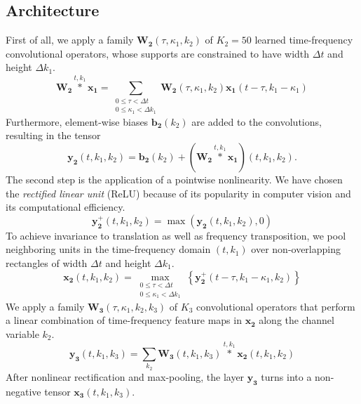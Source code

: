 \documentclass{article}
\begin{document}
\subsection{Architecture}
First of all, we apply a family $\boldsymbol{W_2}(\tau,\kappa_1,k_2)$ of $K_2=50$ learned time-frequency convolutional operators, whose supports are constrained to have width $\Delta t$ and height $\Delta k_1$. 
\begin{equation}
\boldsymbol{W_2}
\overset{t,k_1}{\ast}
\boldsymbol{x_1}
=
\! \!
\sum_{\substack{
0 \leq \tau < \Delta t \\
0 \leq \kappa_1 < \Delta k_1}}
\! \! \! \! \!
\boldsymbol{W_2}(\tau,\kappa_1,k_2)
\boldsymbol{x_1}(t-\tau,k_1-\kappa_1)
\end{equation}
Furthermore, element-wise biases $\boldsymbol{b_2}(k_2)$ are added to the convolutions, resulting in the tensor 
\begin{equation}
\boldsymbol{y_2}(t,k_1,k_2) =
\boldsymbol{b_2}(k_2) + 
(\boldsymbol{W_2}
\overset{t,k_1}{\ast}
\boldsymbol{x_1})(t,k_1,k_2).
\end{equation}
The second step is the application of a pointwise nonlinearity. We have chosen the \emph{rectified linear unit} (ReLU) because of its popularity in computer vision and its computational efficiency.
 \begin{equation}
 \boldsymbol{y_{2}^{+}}(t,k_1,k_2) = \max \left( \boldsymbol{y_2}(t,k_1,k_2), 0\right)
 \end{equation}
 To achieve invariance to translation as well as frequency transposition, we pool neighboring units in
 the time-frequency domain $(t,k_1)$ over non-overlapping rectangles of width $\Delta t$ and height $\Delta k_1$.
 \begin{equation}
 \boldsymbol{x_2}(t,k_1,k_2) = \! \!
 \max_{
\substack{
0 \leq \tau < \Delta t \\
0 \leq \kappa_1 < \Delta k_1}
 } \! \!
\left\{
 \boldsymbol{y_{2}^{+}}(t - \tau, k_1 - \kappa_1, k_2)
 \right\}
 \end{equation}
 We apply a family $\boldsymbol{W_3}(\tau, \kappa_1, k_2, k_3)$ of $K_3$ convolutional operators that perform a linear combination of time-frequency feature maps in $\boldsymbol{x_2}$ along the channel variable $k_2$.
 \begin{equation}
 \boldsymbol{y_3}(t,k_1,k_3) =
 \sum_{k_2}
 \boldsymbol{W_3}(t,k_1,k_3)
 \overset{t,k_1}{\ast}
 \boldsymbol{x_2}(t,k_1,k_2)
 \end{equation}
After nonlinear rectification and max-pooling, the layer $\boldsymbol{y_3}$ turns into a non-negative tensor $\boldsymbol{x_3}(t,k_1,k_3)$.
\end{document}
